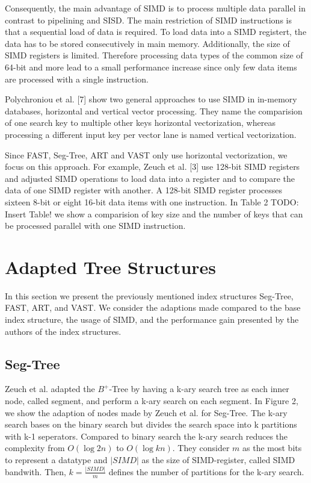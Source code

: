 \documentclass[conference]{IEEEtran}
\begin{document}
Consequently, the main advantage of SIMD is to process multiple data parallel in contrast to pipelining and SISD. The main restriction of SIMD instructions is that a sequential load of data is required. To load data into a SIMD registert, the data has to be stored consecutively in main memory. Additionally, the size of SIMD registers is limited. Therefore processing data types of the common size of 64-bit and more lead to a small performance increase since only few data items are processed with a single instruction.

Polychroniou et al. [7] show two general approaches to use SIMD in in-memory databases, horizontal and vertical vector processing. They name the comparision of one search key to multiple other keys horizontal vectorization, whereas processing a different input key per vector lane is named vertical vectorization.

Since FAST, Seg-Tree, ART and VAST only use horizontal vectorization, we focus on this approach.  For example, Zeuch et al. [3] use 128-bit SIMD registers and adjusted SIMD operations to load data into a register and to compare the data of one SIMD register with another. A 128-bit SIMD register processes sixteen 8-bit or eight 16-bit data items with one instruction. In Table 2 TODO: Insert Table! we show a comparision of key size and the number of keys that can be processed parallel with one SIMD instruction.


\section{Adapted Tree Structures}
In this section we present the previously mentioned index structures Seg-Tree, FAST, ART, and VAST. We consider the adaptions made compared to the base index structure, the usage of SIMD, and the performance gain presented by the authors of the index structures.
\subsection{Seg-Tree}\label{SCM}
Zeuch et al. adapted the $B^+$-Tree by having a k-ary search tree as each inner node, called segment, and perform a k-ary search on each segment.  In Figure 2, we show the adaption of nodes made by Zeuch et al. for Seg-Tree. The k-ary search bases on the binary search but divides the search space into k partitions with k-1 seperators. Compared to binary search the k-ary search reduces the complexity from $O(\log{2}{n})$ to $O(\log{k}{n})$. They consider $m$ as the most bits to represent a datatype and $\vert SIMD \vert$ as the size of SIMD-register, called SIMD bandwith. Then, $k = \frac{\vert SIMD \vert }{m}$ defines the number of partitions for the k-ary search. 
\end{document}
